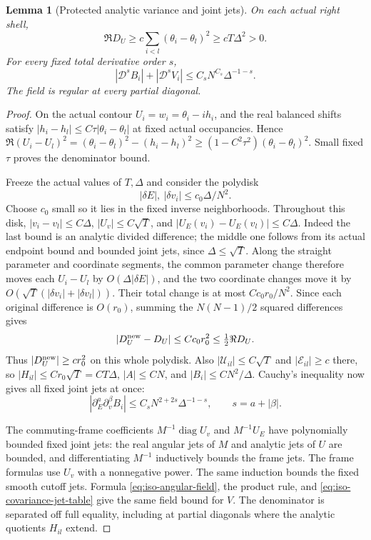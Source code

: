 \documentclass[11pt]{article}
\numberwithin{equation}{section}
\newtheorem{lemma}[theorem]{Lemma}
\theoremstyle{definition}
\begin{document}
\begin{lemma}[Protected analytic variance and joint jets]
\label{lem:iso-covariance-jets}
On each actual right shell,
\begin{equation}\label{eq:iso-covariance-lower}
 \Re D_U\ge c\sum_{i<l}(\theta_i-\theta_l)^2
                   \ge cT\Delta^2>0.
\end{equation}
For every fixed total derivative order $s$,
\begin{equation}\label{eq:iso-field-jets}
 |\mathcal D^s B_i|+|\mathcal D^s V_i|
       \le C_sN^{C_s}\Delta^{-1-s}.
\end{equation}
The field is regular at every partial diagonal.
\end{lemma}
\begin{proof}
On the actual contour $U_i=w_i=\theta_i-ih_i$, and the real
balanced shifts satisfy
$|h_i-h_l|\le C\tau|\theta_i-\theta_l|$ at fixed actual occupancies.
Hence
$\Re(U_i-U_l)^2=(\theta_i-\theta_l)^2-(h_i-h_l)^2
 \ge(1-C^2\tau^2)(\theta_i-\theta_l)^2$.
Small fixed $\tau$ proves the denominator bound.

Freeze the actual values of $T,\Delta$ and consider the polydisk
\[
 |\delta{E}|,\ |\delta v_i|\le c_0\Delta/N^2.
\]
Choose $c_0$ small so it lies in the fixed inverse neighborhoods.
Throughout this disk, $|v_i-v_l|\le C\Delta$,
$|U_v|\le C\sqrt T$, and
$|U_{{E}}(v_i)-U_{{E}}(v_l)|\le C\Delta$.
Indeed the last bound is an analytic divided difference; the middle
one follows from its actual endpoint bound and bounded joint jets,
since $\Delta\le\sqrt T$.
Along the straight parameter and coordinate segments, the common
parameter change therefore moves each $U_i-U_l$ by $O(\Delta
|\delta{E}|)$, and the two coordinate changes move it by
$O(\sqrt T(|\delta v_i|+|\delta v_l|))$.
Their total change is at most $Cc_0r_0/N^2$.
Since each original difference is $O(r_0)$, summing the $N(N-1)/2$
squared differences gives
\[
 |D_U^{\rm new}-D_U|\le Cc_0r_0^2\le\tfrac12\Re D_U.
\]
Thus $|D_U^{\rm new}|\ge cr_0^2$ on this whole polydisk.
Also $|\mathcal U_{il}|\le C\sqrt T$ and
$|\mathcal E_{il}|\ge c$ there, so
$|H_{il}|\le Cr_0\sqrt T=CT\Delta$, $|A|\le CN$, and
$|B_i|\le CN^2/\Delta$.
Cauchy's inequality now gives all fixed joint jets at once:
\begin{equation}\label{eq:iso-covariance-jet-table}
 |\partial_{{E}}^a\partial_v^\beta B_i|
 \le C_sN^{2+2s}\Delta^{-1-s},\qquad s=a+|\beta|.
\end{equation}

The commuting-frame coefficients
$M^{-1}\operatorname{diag}U_v$ and $M^{-1}U_{{E}}$ have
polynomially bounded fixed joint jets: the real angular jets of
$M$ and analytic jets of $U$ are bounded, and differentiating
$M^{-1}$ inductively bounds the frame jets. The frame formulas use
$U_v$ with a nonnegative power. The same induction bounds the
fixed smooth cutoff jets.
Formula \eqref{eq:iso-angular-field}, the product rule, and
\eqref{eq:iso-covariance-jet-table} give the same field bound for $V$.
The denominator is separated off full equality, including at partial
diagonals where the analytic quotients $H_{il}$ extend.
\end{proof}
\end{document}
